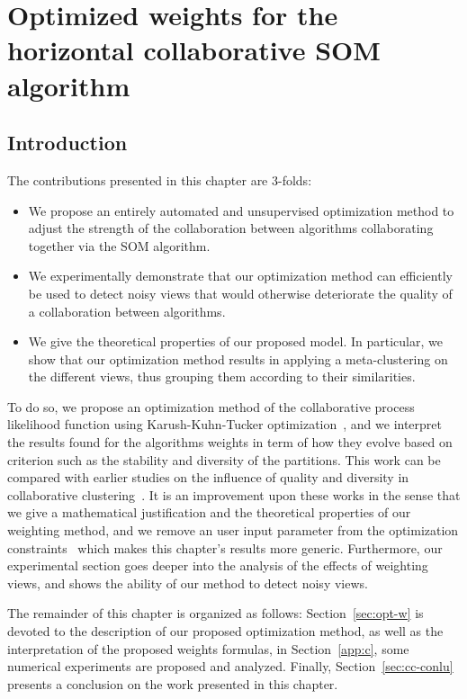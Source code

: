 \chapter{Optimized weights for the horizontal collaborative SOM algorithm}

\minitoc{}
\newpage

\section{Introduction}

The contributions presented in this chapter are 3-folds:
\begin{itemize}
	\item We propose an entirely automated and unsupervised optimization method to adjust the strength of the collaboration between algorithms collaborating together via the SOM algorithm.
	\item We experimentally demonstrate that our optimization method can efficiently be used to detect noisy views that would otherwise deteriorate the quality of a collaboration between algorithms.
	\item We give the theoretical properties of our proposed model. In particular, we show that our optimization method results in applying a meta-clustering on the different views, thus grouping them according to their similarities. 
\end{itemize} 
To do so, we propose an optimization method of the collaborative process likelihood function using Karush-Kuhn-Tucker optimization~\cite{KKT1}, and we interpret the results found for the algorithms weights in term of how they evolve based on criterion such as the stability and diversity of the partitions. This work can be compared with earlier studies on the influence of quality and diversity in collaborative clustering~\cite{grozavu2011learning,DBLP:conf/ssci/RastinCGB15,DBLP:conf/ijcnn/GrozavuCB14,Sublime2017}. It is an improvement upon these works in the sense that we give a mathematical justification and the theoretical properties of our weighting method, and we remove an user input parameter from the optimization constraints~\cite{Sublime2017} which makes this chapter's results more generic. Furthermore, our experimental section goes deeper into the analysis of the effects of weighting views, and shows the ability of our method to detect noisy views.


The remainder of this chapter is organized as follows: Section~\ref{sec:opt-w} is devoted to the description of our proposed optimization method, as well as the interpretation of the proposed weights formulas, in Section~\ref{app:c}, some numerical experiments are proposed and analyzed. Finally, Section~\ref{sec:cc-conlu} presents a conclusion on the work presented in this chapter.


